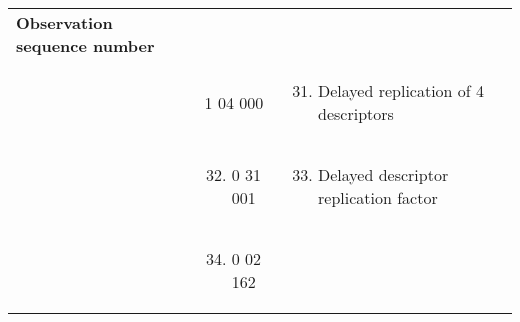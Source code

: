 \begin{longtable}[]{@{}llll@{}}
\begin{minipage}[t]{0.22\columnwidth}
\textbf{Observation sequence number}\strut
\end{minipage} & \begin{minipage}[t]{0.22\columnwidth}\raggedright
\strut
\end{minipage}\tabularnewline
\begin{minipage}[t]{0.22\columnwidth}\raggedright
\strut
\end{minipage} & \begin{minipage}[t]{0.22\columnwidth}\raggedright
1 04 000\strut
\end{minipage} & \begin{minipage}[t]{0.22\columnwidth}\raggedright
\begin{enumerate}
\setcounter{enumi}{30}
\item
  Delayed replication of 4 descriptors
\end{enumerate}\strut
\end{minipage} & \begin{minipage}[t]{0.22\columnwidth}\raggedright
\strut
\end{minipage}\tabularnewline
\begin{minipage}[t]{0.22\columnwidth}\raggedright
\strut
\end{minipage} & \begin{minipage}[t]{0.22\columnwidth}\raggedright
\begin{enumerate}
\setcounter{enumi}{31}
\item
  0 31 001
\end{enumerate}\strut
\end{minipage} & \begin{minipage}[t]{0.22\columnwidth}\raggedright
\begin{enumerate}
\setcounter{enumi}{32}
\item
  Delayed descriptor replication factor
\end{enumerate}\strut
\end{minipage} & \begin{minipage}[t]{0.22\columnwidth}\raggedright
\strut
\end{minipage}\tabularnewline
\begin{minipage}[t]{0.22\columnwidth}\raggedright
\strut
\end{minipage} & \begin{minipage}[t]{0.22\columnwidth}\raggedright
\begin{enumerate}
\setcounter{enumi}{33}
\item
  0 02 162
\end{enumerate}\strut

\end{minipage}
\end{longtable}
